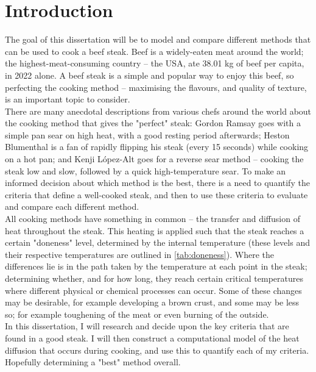 \documentclass[11pt]{article}
\begin{document}
	\clearpage
	\setcounter{page}{2}
	
	\newpage
	
	\section{Introduction}
	
	The goal of this dissertation will be to model and compare different methods that can be used to cook a beef steak. Beef is a widely-eaten meat around the world; the highest-meat-consuming country -- the USA, ate 38.01 kg of beef per capita, in 2022 alone\cite{beef_consumption}. A beef steak is a simple and popular way to enjoy this beef, so perfecting the cooking method -- maximising the flavours, and quality of texture, is an important topic to consider. \\
	
	There are many anecdotal descriptions from various chefs around the world about the cooking method that gives the "perfect" steak: Gordon Ramsay goes with a simple pan sear on high heat, with a good resting period afterwards\cite{ramsay_steak}; Heston Blumenthal is a fan of rapidly flipping his steak (every 15 seconds) while cooking on a hot pan\cite{heston_steak}; and Kenji L\'opez-Alt goes for a reverse sear method -- cooking the steak low and slow, followed by a quick high-temperature sear\cite{kenji_steak}. To make an informed decision about which method is the best, there is a need to quantify the criteria that define a well-cooked steak, and then to use these criteria to evaluate and compare each different method. \\
	
	All cooking methods have something in common -- the transfer and diffusion of heat throughout the steak. This heating is applied such that the steak reaches a certain "doneness" level, determined by the internal temperature (these levels and their respective temperatures are outlined in \autoref{tab:doneness}). Where the differences lie is in the path taken by the temperature at each point in the steak; determining whether, and for how long, they reach certain critical temperatures where different physical or chemical processes can occur. Some of these changes may be desirable, for example developing a brown crust, and some may be less so; for example toughening of the meat or even burning of the outside. \\
	
	In this dissertation, I will research and decide upon the key criteria that are found in a good steak. I will then construct a computational model of the heat diffusion that occurs during cooking, and use this to quantify each of my criteria. Hopefully determining a "best" method overall.
	
\end{document}
